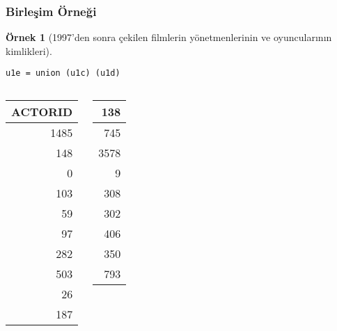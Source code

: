 \documentclass[dvipsnames]{beamer}
\theoremstyle{definition}
\theoremstyle{example}
\newtheorem{ornek}[theorem]{Örnek}
\theoremstyle{plain}
\begin{document}
\begin{frame}[fragile]
  \frametitle{Birleşim Örneği}

  \begin{ornek}[1997'den sonra çekilen filmlerin yönetmenlerinin ve
                oyuncularının kimlikleri]
    \begin{lstlisting}
u1e = union (u1c) (u1d)
    \end{lstlisting}

    \pause
    \begin{columns}[b]
      \begin{tiny}
      \begin{table}
        \begin{tabular}{|r|}\hline
ACTORID\\\hline\hline
   1485\\\hline
    148\\\hline
      0\\\hline
    103\\\hline
     59\\\hline
     97\\\hline
    282\\\hline
    503\\\hline
     26\\\hline
    187\\\hline
      \end{tabular}
      \end{table}
      \end{tiny}

      \begin{tiny}
      \begin{table}
        \begin{tabular}{|r|}\hline
    138\\\hline
    745\\\hline
   3578\\\hline
      9\\\hline
    308\\\hline
    302\\\hline
    406\\\hline
    350\\\hline
    793\\\hline
      \end{tabular}
      \end{table}
      \end{tiny}
    \end{columns}
  \end{ornek}
\end{frame}
\end{document}
